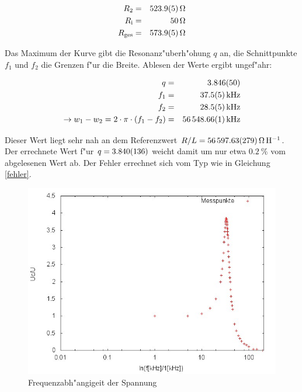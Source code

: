	\begin{eqnarray*}
		R_\mathrm{2} &=& \SI{523.9 (5)}{\ohm}\\
		R_\mathrm{i} &=& \SI{50}{\ohm}\\
		R_\mathrm{ges} &=& \SI{573.9 (5)}{\ohm}
	\end{eqnarray*}

	Das Maximum der Kurve gibt die Resonanz"uberh"ohung $q$ an, die Schnittpunkte $f_1$ und $f_2$ die Grenzen f"ur die Breite.
	Ablesen der Werte ergibt ungef"ahr:

	\begin{eqnarray*}
		q &=& \SI{3.846 (50)}{}\\
		f_1 &=& \SI{37.5 (5)}{\kilo\hertz}\\
		f_2 &=& \SI{28.5 (5)}{\kilo\hertz}\\
		\rightarrow w_1 - w_2 = 2 \cdot \pi \cdot (f_1 - f_2) &=& \SI{56548.66 (1)}{\kilo\hertz}\\
	\end{eqnarray*}

	Dieser Wert liegt sehr nah an dem Referenzwert $R/L = \SI{56597.63 (279)}{\ohm \per \henry}$.
	Der errechnete Wert f"ur $q = \SI{3.840 (136)}{}$ weicht damit um nur etwa $\SI{0.2}{\%}$ vom abgelesenen Wert ab.
	Der Fehler errechnet sich vom Typ wie in Gleichung \eqref{fehler}.

	

	\begin{figure}[htbp]
		\centering
		\includegraphics[width = 12cm]{img/graph_c.jpg}
		\caption{Frequenzabh"angigeit der Spannung}
		\label{frequenz_1}
	\end{figure}

